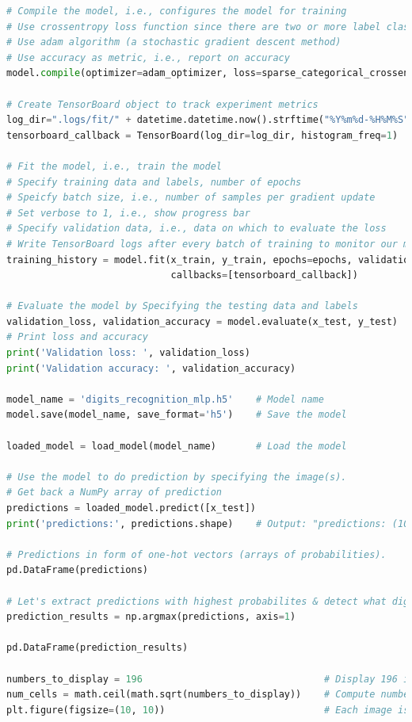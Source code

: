 \documentclass{book}
\begin{document}
\begin{lstlisting}[language=Python, basicstyle=\ttfamily\small, keywordstyle=\color{blue}, commentstyle=\color{forestgreen}, stringstyle=\color{red}, showstringspaces=false]
# Compile the model, i.e., configures the model for training
# Use crossentropy loss function since there are two or more label classes.
# Use adam algorithm (a stochastic gradient descent method)
# Use accuracy as metric, i.e., report on accuracy
model.compile(optimizer=adam_optimizer, loss=sparse_categorical_crossentropy, metrics=['accuracy'])

# Create TensorBoard object to track experiment metrics
log_dir=".logs/fit/" + datetime.datetime.now().strftime("%Y%m%d-%H%M%S")
tensorboard_callback = TensorBoard(log_dir=log_dir, histogram_freq=1)

# Fit the model, i.e., train the model
# Specify training data and labels, number of epochs
# Speicfy batch size, i.e., number of samples per gradient update
# Set verbose to 1, i.e., show progress bar
# Specify validation data, i.e., data on which to evaluate the loss
# Write TensorBoard logs after every batch of training to monitor our metrices
training_history = model.fit(x_train, y_train, epochs=epochs, validation_data=(x_test, y_test),
                             callbacks=[tensorboard_callback])

# Evaluate the model by Specifying the testing data and labels
validation_loss, validation_accuracy = model.evaluate(x_test, y_test)
# Print loss and accuracy
print('Validation loss: ', validation_loss)
print('Validation accuracy: ', validation_accuracy)

model_name = 'digits_recognition_mlp.h5'    # Model name
model.save(model_name, save_format='h5')    # Save the model

loaded_model = load_model(model_name)       # Load the model

# Use the model to do prediction by specifying the image(s). 
# Get back a NumPy array of prediction
predictions = loaded_model.predict([x_test])
print('predictions:', predictions.shape)    # Output: "predictions: (10000, 10)"

# Predictions in form of one-hot vectors (arrays of probabilities).
pd.DataFrame(predictions)

# Let's extract predictions with highest probabilites & detect what digits have been recognized
prediction_results = np.argmax(predictions, axis=1)

pd.DataFrame(prediction_results)

numbers_to_display = 196                                # Display 196 images
num_cells = math.ceil(math.sqrt(numbers_to_display))    # Compute number of images per row
plt.figure(figsize=(10, 10))                            # Each image is in size 10x10 pixels


\end{lstlisting}
\end{document}
